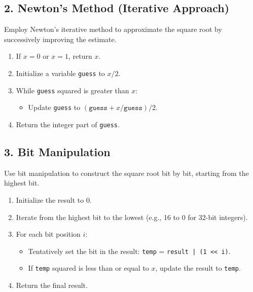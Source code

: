 \subsection*{2. Newton's Method (Iterative Approach)}

Employ Newton's iterative method to approximate the square root by successively improving the estimate.

\begin{enumerate}
    \item If \(x = 0\) or \(x = 1\), return \(x\).
    \item Initialize a variable \texttt{guess} to \(x / 2\).
    \item While \texttt{guess} squared is greater than \(x\):
    \begin{itemize}
        \item Update \texttt{guess} to \((\texttt{guess} + x / \texttt{guess}) / 2\).
    \end{itemize}
    \item Return the integer part of \texttt{guess}.
\end{enumerate}

\subsection*{3. Bit Manipulation}

Use bit manipulation to construct the square root bit by bit, starting from the highest bit.

\begin{enumerate}
    \item Initialize the result to \(0\).
    \item Iterate from the highest bit to the lowest (e.g., 16 to 0 for 32-bit integers).
    \item For each bit position \(i\):
    \begin{itemize}
        \item Tentatively set the bit in the result: \texttt{temp} = \texttt{result | (1 << i)}.
        \item If \texttt{temp} squared is less than or equal to \(x\), update the result to \texttt{temp}.
    \end{itemize}
    \item Return the final result.
\end{enumerate}


